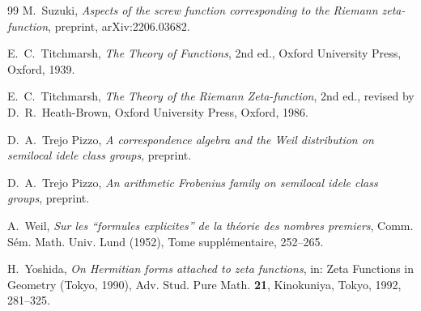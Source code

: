 \documentclass[11pt]{amsart}
\theoremstyle{remark}
\numberwithin{equation}{section}
\begin{document}
\begin{thebibliography}{99}
M.~Suzuki, \emph{Aspects of the screw function corresponding to the Riemann
zeta-function}, preprint, arXiv:2206.03682.

E.~C.~Titchmarsh, \emph{The Theory of Functions}, 2nd ed., Oxford University
Press, Oxford, 1939.

E.~C.~Titchmarsh, \emph{The Theory of the Riemann Zeta-function}, 2nd ed.,
revised by D.~R.~Heath-Brown, Oxford University Press, Oxford, 1986.

 D.~A.~Trejo Pizzo,
\emph{A correspondence algebra and the Weil distribution on semilocal idele
class groups}, preprint.

 D.~A.~Trejo Pizzo,
\emph{An arithmetic Frobenius family on semilocal idele class groups},
preprint.

 A.~Weil,
\emph{Sur les ``formules explicites'' de la th\'eorie des nombres premiers},
Comm. S\'em. Math. Univ. Lund (1952), Tome suppl\'ementaire, 252--265.

H.~Yoshida, \emph{On Hermitian forms attached to zeta functions}, in:
Zeta Functions in Geometry (Tokyo, 1990), Adv. Stud. Pure Math. \textbf{21},
Kinokuniya, Tokyo, 1992, 281--325.

\end{thebibliography}
\end{document}
